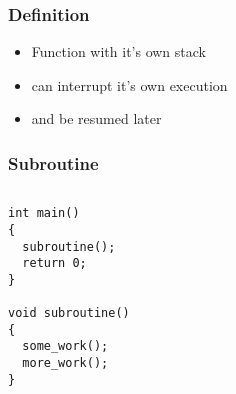 \documentclass{beamer}
\begin{document}

\begin{frame}
\frametitle{Definition}

\begin{itemize}
\item<1-> Function with it's own stack
\item<2-> can interrupt it's own execution
\item<3-> and be resumed later
\end{itemize}
  
\end{frame}

\begin{frame}[fragile]
\frametitle{Subroutine}
\begin{columns}
\begin{column}{0.5\textwidth}
\begin{block}{\vspace*{-3.2ex}}
\begin{lstlisting}
int main()
{
  subroutine();
  return 0;
}

void subroutine()
{
  some_work();
  more_work();
}
\end{lstlisting}
\end{block}
\end{column}
\begin{column}{0.5\textwidth}
\begin{adjustbox}{max totalsize={.9\textwidth}{.7\textheight},center}

\end{adjustbox}
\end{column}
\end{columns}
\end{frame}
\end{document}
